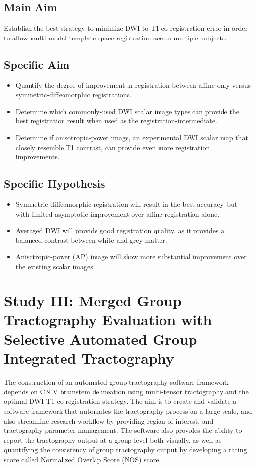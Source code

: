 \subsection{Main Aim}
Establish the best strategy to minimize DWI to T1 co-registration error in order to allow multi-modal template space registration across multiple subjects.

\subsection{Specific Aim}
\begin{itemize}
    \item Quantify the degree of improvement in registration between affine-only versus symmetric-diffeomorphic registrations.
    \item Determine which commonly-used DWI scalar image types can provide the best registration result when used as the registration-intermediate.
    \item Determine if anisotropic-power image, an experimental DWI scalar map that closely resemble T1 contrast, can provide even more registration improvements. 
\end{itemize}

\subsection{Specific Hypothesis}
\begin{itemize}
    \item Symmetric-diffeomorphic registration will result in the best accuracy, but with limited asymptotic improvement over affine registration alone.
    \item Averaged DWI will provide good registration quality, as it provides a balanced contrast between white and grey matter.
    \item Anisotropic-power (AP) image will show more substantial improvement over the existing scalar images.
\end{itemize}

\section[Study III]{Study III: Merged Group Tractography Evaluation with Selective Automated Group Integrated Tractography}
The construction of an automated group tractography software framework depends on CN V brainstem delineation using multi-tensor tractography and the optimal DWI-T1 co-registration strategy. The aim is to create and validate a software framework that automates the tractography process on a large-scale, and also streamline research workflow by providing region-of-interest, and tractography parameter management. The software also provides the ability to report the tractography output at a group level both visually, as well as quantifying the consistency of group tractography output by developing a rating score called Normalized Overlap Score (NOS) score. 

